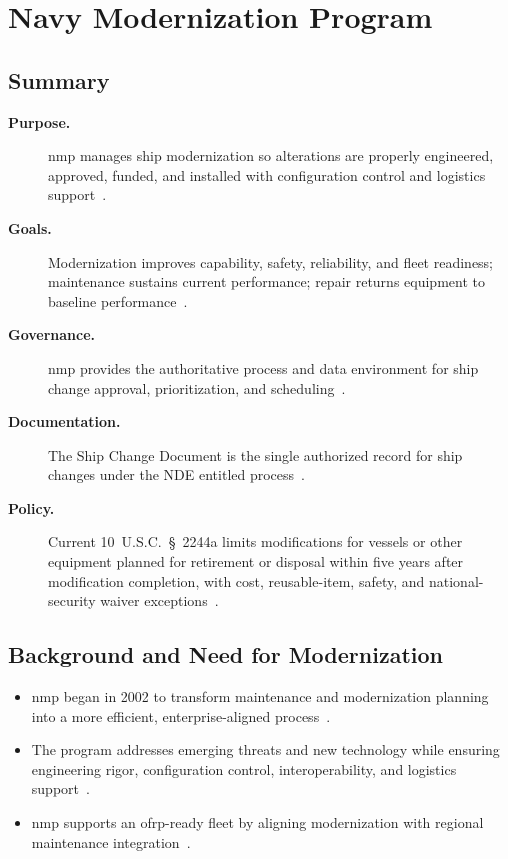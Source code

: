 \documentclass[../main.tex]{subfiles}
\begin{document}
\section{Navy Modernization Program}

\subsection{Summary}
\begin{description}
  \item[\textbf{Purpose.}] \ac{nmp} manages ship modernization so alterations are properly engineered, approved, funded, and installed with configuration control and logistics support~\autocite{edo-4-1-2-navy-modernization-2025,SL720-AA-MAN-030,JFMM-VolVI-RevD-Chg5-2025}.
  \item[\textbf{Goals.}] Modernization improves capability, safety, reliability, and fleet readiness; maintenance sustains current performance; repair returns equipment to baseline performance~\autocite{edo-4-1-2-navy-modernization-2025}.
  \item[\textbf{Governance.}] \ac{nmp} provides the authoritative process and data environment for ship change approval, prioritization, and scheduling~\autocite{edo-4-1-2-navy-modernization-2025,SL720-AA-MAN-030,JFMM-VolVI-RevD-Chg5-2025}.
  \item[\textbf{Documentation.}] The Ship Change Document is the single authorized record for ship changes under the NDE entitled process~\autocite{edo-4-1-2-navy-modernization-2025,SL720-AA-MAN-030,JFMM-VolVI-RevD-Chg5-2025}.
  \item[\textbf{Policy.}] Current 10~U.S.C.~\S~2244a limits modifications for vessels or other equipment planned for retirement or disposal within five years after modification completion, with cost, reusable-item, safety, and national-security waiver exceptions~\autocite{USC-10-2244a,edo-4-1-2-navy-modernization-2025}.
\end{description}

\subsection{Background and Need for Modernization}
\begin{itemize}
  \item \ac{nmp} began in 2002 to transform maintenance and modernization planning into a more efficient, enterprise-aligned process~\autocite{edo-4-1-2-navy-modernization-2025}.
  \item The program addresses emerging threats and new technology while ensuring engineering rigor, configuration control, interoperability, and logistics support~\autocite{edo-4-1-2-navy-modernization-2025}.
  \item \ac{nmp} supports an \ac{ofrp}-ready fleet by aligning modernization with regional maintenance integration~\autocite{edo-4-1-2-navy-modernization-2025}.
\end{itemize}
\end{document}
